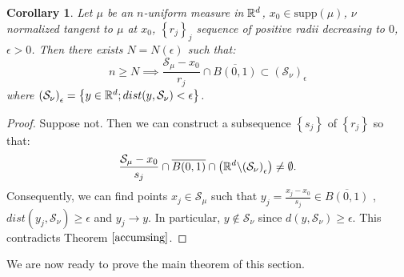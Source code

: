 \documentclass[11pt]{article}
\newtheorem{corollary}[theorem]{Corollary}
\theoremstyle{definition}
\theoremstyle{remark}
\numberwithin{equation}{section}
\begin{document}
\begin{corollary} \label{convsingset}
Let $\mu$ be an $n$-uniform measure in $\mathbb{R}^{d}$, $x_0 \in \mbox{supp}(\mu)$, $\nu$ normalized tangent to $\mu$ at $x_0$, $\left\lbrace r_j \right\rbrace _{j}$ sequence of positive radii decreasing to $0$, $\epsilon >0$.
Then there exists $N = N(\epsilon)$ such that:
\begin{equation}
n \geq N \implies \frac{\mathcal{S}_{\mu} - x_0}{r_j} \cap \overline{B(0,1)} \subset \left( \mathcal{S}_{\nu} \right) _{\epsilon} 
\end{equation}
where $\left( \mathcal{S}_{\nu} \right) _{\epsilon} = \left\lbrace y \in \mathbb{R}^{d} ; dist(y, \mathcal{S}_{\nu}) < \epsilon \right\rbrace$.
\end{corollary}
\begin{proof}
Suppose not. Then we can construct a subsequence $\left\lbrace s_j \right\rbrace$ of $\left\lbrace r_j \right\rbrace$ so that: 
$$ \frac{\mathcal{S}_{\mu} - x_0}{s_j} \cap \overline{B(0,1)} \cap \left( \mathbb{R}^{d} \backslash { \left( \mathcal{S}_{\nu} \right) _{\epsilon}}\right) \neq \emptyset .$$
Consequently, we can find points $x_j \in \mathcal{S}_{\mu}$ such that $y_{j} = \frac{x_j - x_0}{s_j} \in \overline{B(0,1)} $ , $dist(y_j , \mathcal{S}_{\nu}) \geq \epsilon $ and $y_j \to y$. In particular, $y \notin \mathcal{S}_{\nu}$ since $d(y , \mathcal{S}_{\nu}) \geq \epsilon$. This contradicts Theorem $\ref{accumsing}$.
\end{proof}
We are now ready to prove the main theorem of this section.
\end{document}
